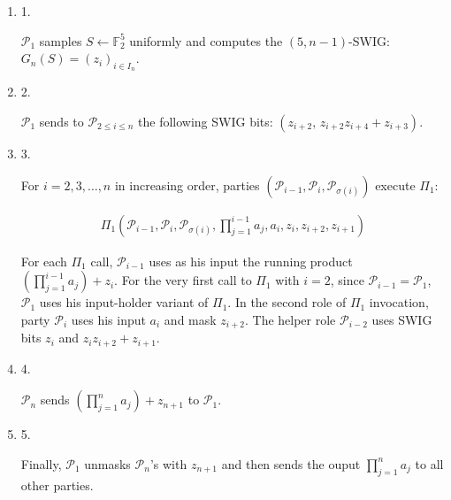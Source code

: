 \documentclass[10pt,a4paper]{article}
\begin{document}
\begin{enumerate}


\item[] 
1. 


$\mathcal{P}_{1}$ samples $S\leftarrow\mathbb{F}_{2}^{5}$ uniformly and computes the $(5,n-1)$-SWIG: $G_{n}(S)=(z_{i})_{i\in I_{n}}$.\par





\item[] 
2. 


$\mathcal{P}_{1}$ sends to $\mathcal{P}_{2\leq i\leq n}$ the following SWIG bits: $(z_{i+2},\,z_{i+2}z_{i+4}+z_{i+3})$.\par





\item[] 
3. 


For $i=2,3,\dots,n$ in increasing order, parties $(\mathcal{P}_{i-1},\mathcal{P}_{i},\mathcal{P}_{\sigma(i)})$ execute $\Pi_{1}$:\par


\[\begin{gathered}
\Pi_{1}\!\left(\mathcal{P}_{i-1},\mathcal{P}_{i},\mathcal{P}_{\sigma(i)},\prod_{j=1}^{i-1}a_{j},a_{i},z_{i},z_{i+2},z_{i+1}\right)
\end{gathered}\]


For each $\Pi_{1}$ call, $\mathcal{P}_{i-1}$ uses as his input the running product $(\prod_{j=1}^{i-1}a_{j})+z_{i}$. For the very first call to $\Pi_{1}$ with $i=2$, since $\mathcal{P}_{i-1}=\mathcal{P}_{1}$, $\mathcal{P}_{1}$ uses his input-holder variant of $\Pi_{1}$. In the second role of $\Pi_{1}$ invocation, party $\mathcal{P}_{i}$ uses his input $a_{i}$ and mask $z_{i+2}$. The helper role $\mathcal{P}_{i-2}$ uses SWIG bits $z_{i}$ and $z_{i}z_{i+2}+z_{i+1}$.\par





\item[] 
4. 


$\mathcal{P}_{n}$ sends $(\prod_{j=1}^{n}a_{j})+z_{n+1}$ to $\mathcal{P}_{1}$.\par





\item[] 
5. 


Finally, $\mathcal{P}_{1}$ unmasks $\mathcal{P}_{n}$’s with $z_{n+1}$ and then sends the ouput $\prod_{j=1}^{n}a_{j}$ to all other parties.\par





\end{enumerate}
\end{document}
